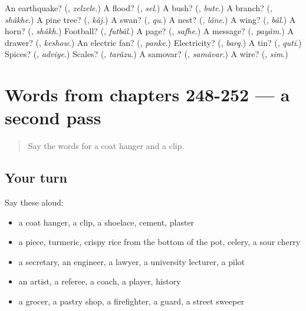 \begin{tcolorbox}[breakable,colback=teal!4,colframe=teal!35!black,title={Before you move on}]
An earthquake? (\textbf{}, \emph{zelzele}.) A flood? (\textbf{}, \emph{sel}.) A bush? (\textbf{}, \emph{bute}.) A branch? (\textbf{}, \emph{shâkhe}.) A pine tree? (\textbf{}, \emph{kâj}.) A swan? (\textbf{}, \emph{qu}.) A nest? (\textbf{}, \emph{lâne}.) A wing? (\textbf{}, \emph{bâl}.) A horn? (\textbf{}, \emph{shâkh}.) Football? (\textbf{}, \emph{futbâl}.) A page? (\textbf{}, \emph{safhe}.) A message? (\textbf{}, \emph{payâm}.) A drawer? (\textbf{}, \emph{keshow}.) An electric fan? (\textbf{}, \emph{panke}.) Electricity? (\textbf{}, \emph{barq}.) A tin? (\textbf{}, \emph{quti}.) Spices? (\textbf{}, \emph{adviye}.) Scales? (\textbf{}, \emph{tarâzu}.) A samovar? (\textbf{}, \emph{samâvar}.) A wire? (\textbf{}, \emph{sim}.)
\end{tcolorbox}
\section[(dialogue)]{Words from chapters 248-252 — a second pass}

\label{lesson:FA-R252-second-pass-words-from-chapters-248-252}



\begin{quote}
Say the words for a coat hanger and a clip.
\end{quote}

\subsection*{Your turn}
Say these aloud:

\begin{itemize}
\raggedright
  \item a coat hanger, a clip, a shoelace, cement, plaster
  \item a piece, turmeric, crispy rice from the bottom of the pot, celery, a sour cherry
  \item a secretary, an engineer, a lawyer, a university lecturer, a pilot
  \item an artist, a referee, a coach, a player, history
  \item a grocer, a pastry shop, a firefighter, a guard, a street sweeper
\end{itemize}

